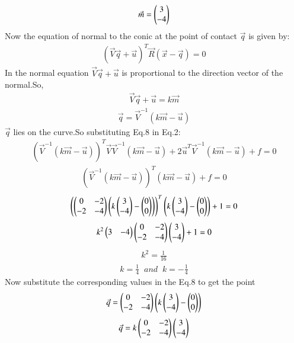 \documentclass[journal]{IEEEtran}
\theoremstyle{remark}
\begin{document}
\begin{align}
 \Vec{m}=\begin{pmatrix}3\\-4\end{pmatrix}
\end{align}
Now the equation of normal to the conic at the point of contact $\Vec{q}$ is given by:
\begin{align}
   (\Vec{V}\Vec{q}+\Vec{u})^T\Vec{R}(\Vec{x}-\Vec{q})=0
\end{align}
In the normal equation $\Vec{V}\Vec{q}+\Vec{u}$ is proportional to the direction vector of the normal.So,
\begin{align}
 \Vec{V}\Vec{q}+\Vec{u}=k\Vec{m}
\end{align}
\begin{align}
 \Vec{q}=\Vec{V}^{-1}(k\Vec{m}-\Vec{u})
\end{align}
$\Vec{q}$ lies on the curve.So substituting Eq.8 in Eq.2:
\begin{align}
    (\Vec{V}^{-1}(k\Vec{m}-\Vec{u}))^T\Vec{V}\Vec{V}^{-1}(k\Vec{m}-\Vec{u})+2\Vec{u}^T\Vec{V}^{-1}(k\Vec{m}-\Vec{u})+f=0
\end{align}
\begin{align}
    (\Vec{V}^{-1}(k\Vec{m}-\Vec{u}))^T(k\Vec{m}-\Vec{u})+f=0
\end{align}
\begin{align}
    \left(\begin{pmatrix}0&-2\\-2&-4\end{pmatrix}\begin{pmatrix}k\begin{pmatrix}3\\-4\end{pmatrix}-\begin{pmatrix}0\\0\end{pmatrix}\end{pmatrix}\right)^T\begin{pmatrix}k\begin{pmatrix}3\\-4\end{pmatrix}-\begin{pmatrix}0\\0\end{pmatrix}\end{pmatrix} +1=0
\end{align}
\begin{align}
     k^2\begin{pmatrix}3&-4\end{pmatrix}\begin{pmatrix}0&-2\\-2&-4\end{pmatrix}\begin{pmatrix}3\\-4\end{pmatrix}+1=0
\end{align}
\begin{align}
    k^2=\frac{1}{16}
\end{align}
\begin{align}
    k=\frac{1}{4}\;\;and\;\;k=-\frac{1}{4}
\end{align}
Now substitute the corresponding values in the Eq.8 to get the point
\begin{align}
    \Vec{q}=\begin{pmatrix}0&-2\\-2&-4\end{pmatrix}\begin{pmatrix}k\begin{pmatrix}3\\-4\end{pmatrix}-\begin{pmatrix}0\\0\end{pmatrix}\end{pmatrix}
\end{align}
\begin{align}
    \Vec{q}=k\begin{pmatrix}0&-2\\-2&-4\end{pmatrix}\begin{pmatrix}3\\-4\end{pmatrix}
\end{align}
\end{document}
